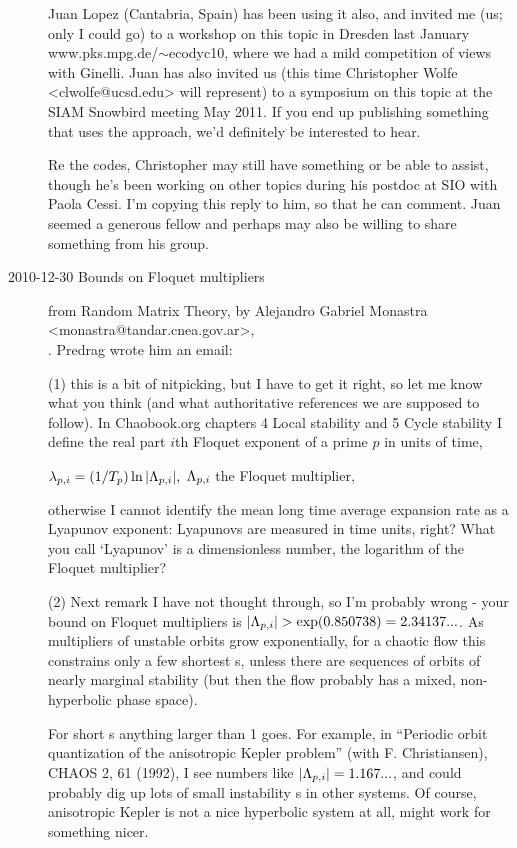 \begin{description}
Juan Lopez (Cantabria, Spain) has been using it also, and invited me (us;
only I could go) to a workshop on this topic in Dresden last January
{www.pks.mpg.de/$\sim$ecodyc10},
where we had a mild competition of views with Ginelli.   Juan has also
invited us (this time Christopher Wolfe <clwolfe@ucsd.edu> will
represent) to a symposium on this topic at the SIAM Snowbird meeting May
2011.  If you end up publishing something that uses the approach, we'd
definitely be interested to hear.

Re the codes, Christopher may still have something or be able to assist,
though he's been working on other topics during his postdoc at SIO with
Paola Cessi.  I'm copying this reply to him, so that he can comment.
Juan seemed a generous fellow and perhaps may also be willing to share
something from his group.

\item[2010-12-30 Bounds on Floquet multipliers]
from Random Matrix Theory,
by Alejandro Gabriel Monastra <monastra@tandar.cnea.gov.ar>,
\\
. Predrag
wrote him an email:

(1)
this is a bit of nitpicking, but I have to get it right, so let me know what you
think (and what authoritative references we are supposed to follow). In
Chaobook.org chapters
4 Local stability
and
5 Cycle stability
I define the real part $i$th Floquet exponent of a prime {\po} $p$
in units of time,

$ \lambda_{p,i} = (1/T_p) \ln |\Lambda_{p,i}| ,$
$\Lambda_{p,i}$ the Floquet multiplier,

otherwise I cannot identify the mean long time average expansion rate
as a Lyapunov exponent: Lyapunovs are measured in time units, right?
What you call `Lyapunov' is a dimensionless number,
the logarithm of the Floquet multiplier?

(2)
Next remark I have not thought through, so I'm probably wrong - your bound
on Floquet multipliers is  $|\Lambda_{p,i}| > \exp(0.850738) =2.34137...$. As
multipliers of unstable orbits grow exponentially, for a chaotic flow this
constrains only a few shortest {\po s}, unless there are sequences of
orbits of nearly marginal stability (but then the flow probably has a mixed,
non-hyperbolic phase space).

For short {\po s} anything larger than 1 goes. For example, in
{``Periodic orbit quantization} of the anisotropic Kepler problem''
(with F. Christiansen), CHAOS 2, 61 (1992), I see numbers like
$|\Lambda_{p,i}| = 1.167...$, and could probably dig up lots of small
instability {\po s} in other systems. Of course, anisotropic Kepler
is not a nice hyperbolic system at all, might work for something nicer.


\end{description}
